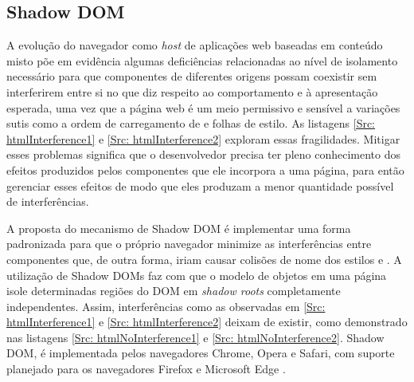 
\subsection{Shadow DOM}

A evolução do navegador como \textit{host} de aplicações web baseadas em conteúdo misto põe em evidência algumas deficiências relacionadas ao nível de isolamento necessário para que componentes de diferentes origens possam coexistir sem interferirem entre si no que diz respeito ao comportamento e à apresentação esperada, uma vez que a página web é um meio permissivo e sensível a variações sutis como a ordem de carregamento de \scripts{} e folhas de estilo. As listagens \ref{Src: htmlInterference1} e \ref{Src: htmlInterference2} exploram essas fragilidades. Mitigar esses problemas significa que o desenvolvedor precisa ter pleno conhecimento dos efeitos produzidos pelos componentes que ele incorpora a uma página, para então gerenciar esses efeitos de modo que eles produzam a menor quantidade possível de interferências.

A proposta do mecanismo de Shadow DOM é implementar uma forma padronizada para que o próprio navegador minimize as interferências entre componentes que, de outra forma, iriam causar colisões de nome dos estilos e \scripts{}. A utilização de Shadow DOMs faz com que o modelo de objetos em uma página isole determinadas regiões do DOM em \textit{shadow roots} completamente independentes. Assim, interferências como as observadas em \ref{Src: htmlInterference1} e \ref{Src: htmlInterference2} deixam de existir, como demonstrado nas listagens \ref{Src: htmlNoInterference1} e \ref{Src: htmlNoInterference2}. Shadow DOM,  é implementada pelos navegadores Chrome, Opera e Safari, com suporte planejado para os navegadores Firefox e Microsoft Edge .